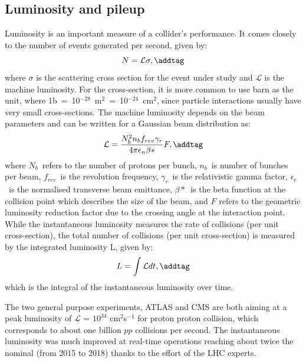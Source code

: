 \subsection{Luminosity and pileup}
\label{sec:LHC:pileup}
Luminosity is an important measure of a collider's performance.
It comes closely to the number of events generated per second, given by:
\[
	N = \mathcal{L}\sigma,
\addtag \]
where $\sigma$ is the scattering cross section 
for the event under study and $\mathcal{L}$ is the machine luminosity. 
For the cross-section, it is more common to use barn as the unit, 
where 1b~=~10$^{-28}$~m$^2$~=~10$^{-24}$~cm$^2$, 
since particle interactions usually have very small cross-sections. 
The machine luminosity depends on the beam parameters 
and can be written for a Gaussian beam distribution as:
\[
	\mathcal{L} = \frac{N_b^2 n_b f_{rev} \gamma_r}{4\pi \epsilon_n \beta*} F,
\addtag \]
where $N_b$~refers to the number of protons per bunch,
$n_b$~is number of bunches per beam,
$f_{rev}$~is the revolution frequency, 
$\gamma_r$~is the relativistic gamma factor, 
$\epsilon_r$~is the normalised transverse beam emittance, 
$\beta*$~is the beta function at the collision point which
describes the size of the beam, 
and	$F$ refers to the geometric luminosity reduction factor due to the 
crossing angle at the interaction point. 
While the instantaneous luminosity measures the rate of collisions (per unit cross-section), 
the total number of collisions (per unit cross-section) is measured by the integrated luminosity L, 
given by:
\[
	L = \int \mathcal{L} dt,
\addtag \]
which is the integral of the instantaneous luminosity over time.

The two general purpose experiments, ATLAS and CMS are
both aiming at a peak luminosity of $\mathcal{L}$ = $10^{34}$ cm$^2$s$^{-1}$ for proton proton collision,
which corresponds to about one billion $pp$ collisions per second. 
The instantaneous luminosity was much improved at real-time operations reaching about 
twice the nominal (from 2015 to 2018) thanks to the effort of the LHC experts. 

